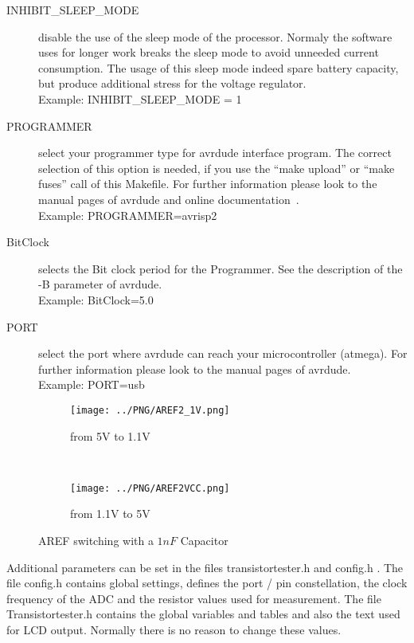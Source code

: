\begin{description}
  \item[INHIBIT\_SLEEP\_MODE] disable the use of the sleep mode of the processor.
Normaly the software uses for longer work breaks the sleep mode to avoid unneeded current consumption.
The usage of this sleep mode indeed spare battery capacity, but produce additional stress for the voltage regulator.\\
Example: INHIBIT\_SLEEP\_MODE = 1

  \item[PROGRAMMER] select your programmer type for avrdude interface program.
The correct selection of this option is needed, if you use the ``make upload'' or ``make fuses'' call
of this Makefile.
For further information please look to the manual pages of avrdude and online documentation~\cite{avrdude}.\\
Example: PROGRAMMER=avrisp2

  \item[BitClock] selects the Bit clock period for the Programmer. See the description of the -B parameter of avrdude.\\
Example: BitClock=5.0

  \item[PORT] select the port where avrdude can reach your microcontroller (atmega).
For further information please look to the manual pages of avrdude.\\
Example: PORT=usb

\end{description}

\begin{figure}[H]
  \begin{subfigure}[b]{8.6cm}
    \centering
    \texttt{[image: ../PNG/AREF2\_1V.png]}
    \caption{from 5V to 1.1V }
    \label{pic:aref1}
  \end{subfigure}
  ~
  \begin{subfigure}[b]{8.6cm}
    \centering
    \texttt{[image: ../PNG/AREF2VCC.png]}
    \caption{from 1.1V to 5V}
    \label{pic:aref5}
  \end{subfigure}
  \caption{AREF switching with a \(1nF\) Capacitor}
\end{figure}


Additional parameters can be set in the files transistortester.h and config.h .
The file config.h contains global settings, defines the port / pin constellation,
 the clock frequency of the ADC and the resistor values used for measurement.
The file Transistortester.h contains the global variables and tables and also the text used for LCD output.
Normally there is no reason to change these values.
